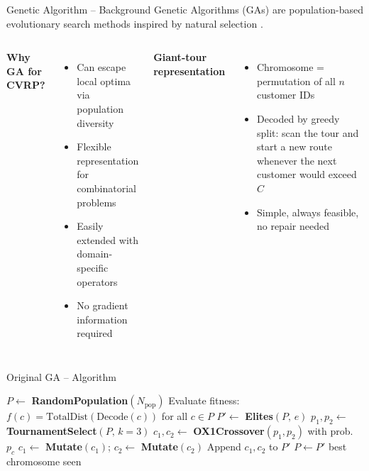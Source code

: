 \documentclass[aspectratio=169]{beamer}
\begin{document}
\begin{frame}{Genetic Algorithm -- Background}
  Genetic Algorithms (GAs) are population-based evolutionary search methods
  inspired by natural selection \cite{holland1975adaptation, goldberg1989genetic}.
  \vspace{6pt}

  \begin{columns}
    \textbf{Why GA for CVRP?}
    \begin{itemize}
      \item Can escape local optima via population diversity
      \item Flexible representation for combinatorial problems
      \item Easily extended with domain-specific operators
      \item No gradient information required
    \end{itemize}

    \textbf{Giant-tour representation}
    \begin{itemize}
      \item Chromosome = permutation of all $n$ customer IDs
      \item Decoded by greedy split: scan the tour and start a new route
            whenever the next customer would exceed $C$
      \item Simple, always feasible, no repair needed
    \end{itemize}
  \end{columns}
\end{frame}

\begin{frame}{Original GA -- Algorithm}
  \begin{algorithm}[H]
  \caption{Original Genetic Algorithm for CVRP}
  \begin{algorithmic}[1]
    \State $P \leftarrow$ \textbf{RandomPopulation}$(N_{\text{pop}})$
      \State Evaluate fitness: $f(c) = \text{TotalDist}(\text{Decode}(c))$ for all $c \in P$
      \State $P' \leftarrow$ \textbf{Elites}$(P,\, e)$  
        \State $p_1, p_2 \leftarrow$ \textbf{TournamentSelect}$(P,\, k=3)$
        \State $c_1, c_2 \leftarrow$ \textbf{OX1Crossover}$(p_1, p_2)$ with prob.\ $p_c$
        \State $c_1 \leftarrow$ \textbf{Mutate}$(c_1)$;\; $c_2 \leftarrow$ \textbf{Mutate}$(c_2)$
        \State Append $c_1, c_2$ to $P'$
      \EndWhile
      \State $P \leftarrow P'$
    \EndFor
    \State \Return best chromosome seen
  \end{algorithmic}
  \end{algorithm}
\end{frame}
\end{document}
